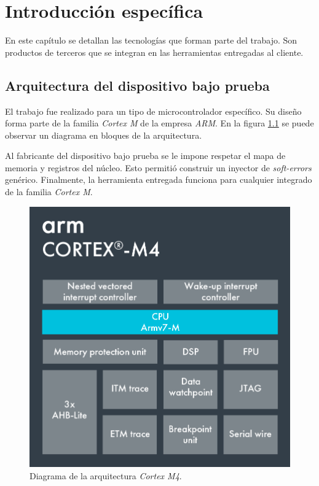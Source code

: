 \chapter{Introducción específica}

\label{Chapter2}

En este capítulo se detallan las tecnologías que forman parte del trabajo.
Son productos de terceros que se integran en las herramientas entregadas al cliente.

\section{Arquitectura del dispositivo bajo prueba}
\label{sec:dut}

El trabajo fue realizado para un tipo de microcontrolador específico.
Su diseño forma parte de la familia \emph{Cortex M} de la empresa \emph{ARM}.
En la figura \ref{fig:cortexm} se puede observar un diagrama en bloques de la arquitectura.

Al fabricante del dispositivo bajo prueba se le impone respetar el mapa de memoria y registros del núcleo.
Esto permitió construir un inyector de \emph{soft-errors} genérico.
Finalmente, la herramienta entregada funciona para cualquier integrado de la familia \emph{Cortex M}.

\begin{figure}[htbp]
	\centering
	\includegraphics[width=.7\textwidth]{./Figures/Cortex-M4.png}
    \caption{Diagrama de la arquitectura \emph{Cortex M4}\protect\footnotemark.}
	\label{fig:cortexm}
\end{figure}

\newpage

